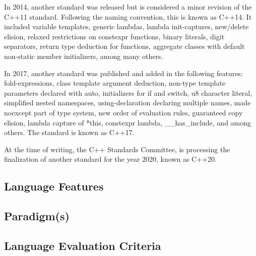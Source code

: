 \documentclass[12pt]{article}
\begin{document}
In 2014, another standard was released but is considered a minor revision of the C++11 standard. Following the naming convention, this is known as C++14. It included variable templates, generic lambdas, lambda init-captures, new/delete elision, relaxed restrictions on constexpr functions, binary literals, digit separators, return type deduction for functions, aggregate classes with default non-static member initializers, among many others.

In 2017, another standard was published and added in the following features: fold-expressions, class template argument deduction, non-type template parameters declared with auto, initializers for if and switch, u8 character literal, simplified nested namespaces, using-declaration declaring multiple names, made noexcept part of type system, new order of evaluation rules, guaranteed copy elision, lambda capture of *this, constexpr lambda, \_\_has\_include, and among others. The standard is known as C++17.

At the time of writing, the C++ Standards Committee, is processing the finalization of another standard for the year 2020, known as C++20.

\subsection{Language Features}
\subsection{Paradigm(s)}

\subsection{Language Evaluation Criteria}

\iffalse



%
%
%
\end{document}
